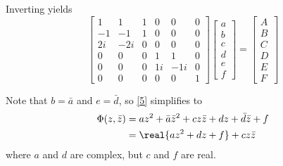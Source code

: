\documentclass{article}
\begin{document}
%
Inverting yields
%
\begin{equation}
    \begin{bmatrix}
	1& 1& 1& 0& 0& 0 \\
	-1& -1& 1& 0& 0& 0 \\
	2i& -2i& 0& 0& 0& 0 \\
	0& 0& 0& 1& 1& 0 \\
	0& 0& 0& 1i& -1i& 0 \\
	0& 0& 0& 0& 0& 1
    \end{bmatrix}
    \begin{bmatrix}a \\ b \\ c \\ d \\ e \\ f \end{bmatrix}
    =
    \begin{bmatrix}A \\ B \\ C \\ D \\ E \\ F \end{bmatrix}
\end{equation}

Note that $b = \bar{a}$ and $e = \bar{d}$, so \eqref{5} simplifies to
%
\begin{align}\label{7}
    \Phi(z, \bar{z}) 
    &= a z^2 + \bar{a} \bar{z}^2 + c z \bar{z} + d z + \bar{d} \bar{z} + f \\
    &= \real{a z^2 + d z + f} + c z \bar{z}
\end{align}
%
where $a$ and $d$ are complex, but $c$ and $f$ are real.

\end{document}
